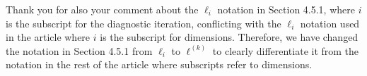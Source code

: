 \documentclass[11pt]{report}
\begin{document}

Thank you for also your comment about the $\ell_i$ notation in Section 4.5.1, where $i$ is the subscript for the diagnostic iteration, conflicting with the $\ell_i$ notation used in the article where $i$ is the subscript for dimensions. Therefore, we have changed the notation in Section 4.5.1 from $\ell_i$ to $\ell^{(k)}$ to clearly differentiate it from the notation in the rest of the article where subscripts refer to dimensions.



\end{document}
